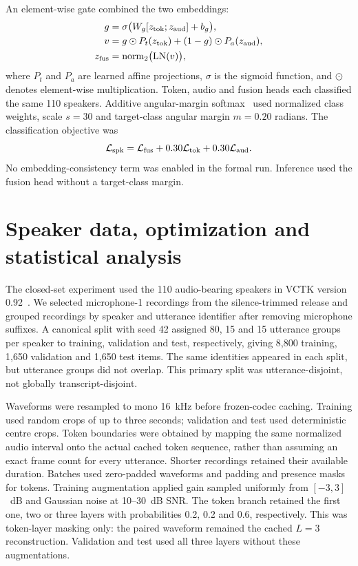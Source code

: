 An element-wise gate combined the two embeddings:
\begin{equation}
\begin{aligned}
 g&=\sigma\bigl(W_g[z_{\rm tok};z_{\rm aud}]+b_g\bigr),\\
 v&=g\odot P_t(z_{\rm tok})+(1-g)\odot P_a(z_{\rm aud}),\\
 z_{\rm fus}&=\operatorname{norm}_2\bigl(\operatorname{LN}(v)\bigr),
\end{aligned}
\end{equation}
where $P_t$ and $P_a$ are learned affine projections, $\sigma$ is the sigmoid function, and $\odot$ denotes element-wise multiplication. Token, audio and fusion heads each classified the same 110 speakers. Additive angular-margin softmax~\cite{arcface} used normalized class weights, scale $s=30$ and target-class angular margin $m=0.20$ radians. The classification objective was
\begin{equation}
 \mathcal L_{\rm spk}
 =\mathcal L_{\rm fus}
  +0.30\mathcal L_{\rm tok}
  +0.30\mathcal L_{\rm aud}.
\end{equation}
No embedding-consistency term was enabled in the formal run. Inference used the fusion head without a target-class margin.

\section{Speaker data, optimization and statistical analysis}
The closed-set experiment used the 110 audio-bearing speakers in VCTK version 0.92~\cite{vctk}. We selected microphone-1 recordings from the silence-trimmed release and grouped recordings by speaker and utterance identifier after removing microphone suffixes. A canonical split with seed 42 assigned 80, 15 and 15 utterance groups per speaker to training, validation and test, respectively, giving 8,800 training, 1,650 validation and 1,650 test items. The same identities appeared in each split, but utterance groups did not overlap. This primary split was utterance-disjoint, not globally transcript-disjoint.

Waveforms were resampled to mono 16~kHz before frozen-codec caching. Training used random crops of up to three seconds; validation and test used deterministic centre crops. Token boundaries were obtained by mapping the same normalized audio interval onto the actual cached token sequence, rather than assuming an exact frame count for every utterance. Shorter recordings retained their available duration. Batches used zero-padded waveforms and padding and presence masks for tokens. Training augmentation applied gain sampled uniformly from $[-3,3]$~dB and Gaussian noise at 10--30~dB SNR. The token branch retained the first one, two or three layers with probabilities 0.2, 0.2 and 0.6, respectively. This was token-layer masking only: the paired waveform remained the cached $L=3$ reconstruction. Validation and test used all three layers without these augmentations.

